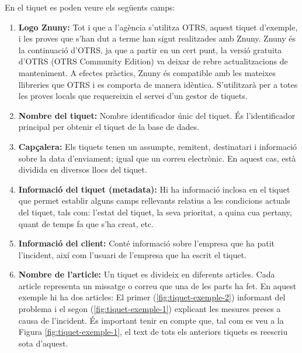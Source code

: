 En el tiquet es poden veure els següents camps:
\begin{enumerate}
    \item \textbf{Logo Znuny:} Tot i que a l'agència s'utilitza OTRS, aquest tiquet d'exemple, i les proves que s'han dut a terme han sigut realitzades amb Znuny. Znuny és la continuació d'OTRS, ja que a partir en un cert punt, la versió gratuita d'OTRS (OTRS Community Edition) va deixar de rebre actualitzacions de manteniment. A efectes pràctics, Znuny és compatible amb les mateixes llibreries que OTRS i es comporta de manera idèntica. S'utilitzarà per a totes les proves locals que requereixin el servei d'un gestor de tiquets.
    \item \textbf{Nombre del tiquet:} Nombre identificador únic del tiquet. És l'identificador principal per obtenir el tiquet de la base de dades.
    \item \textbf{Capçalera:} Els tiquets tenen un assumpte, remitent, destinatari i informació sobre la data d'enviament; igual que un correu electrònic. En aquest cas, està dividida en diversos llocs del tiquet.
    \item \textbf{Informació del tiquet (metadata):} Hi ha informació inclosa en el tiquet que permet establir alguns camps rellevants relatius a les condicions actuals del tiquet, tals com: l'estat del tiquet, la seva prioritat, a quina cua pertany, quant de temps fa que s'ha creat, etc.
    \item \textbf{Informació del client:} Conté informació sobre l'empresa que ha patit l'incident, així com l'usuari de l'empresa que ha escrit el tiquet.
    \item \textbf{Nombre de l'article:} Un tiquet es divideix en diferents articles. Cada article representa un missatge o correu que una de les parts ha fet. En aquest exemple hi ha dos articles: El primer (\ref{fig:tiquet-exemple-2}) informant del problema i el segon (\ref{fig:tiquet-exemple-1}) explicant les mesures preses a causa de l'incident. És important tenir en compte que, tal com es veu a la Figura \ref{fig:tiquet-exemple-1}, el text de tots els anteriors tiquets es reescriu sota d'aquest.
\end{enumerate}

